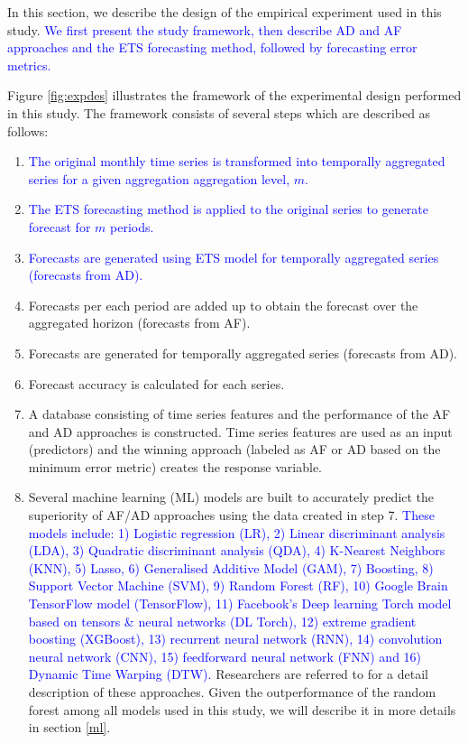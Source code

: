 \documentclass[preprint, 3p,
authoryear]{elsarticle} %
\begin{document}
In this section, we describe the design of the empirical experiment used
in this study.
\textcolor{blue}{We first present the study framework, then describe AD and AF approaches and the ETS forecasting method, followed by forecasting error metrics.}

Figure \ref{fig:expdes} illustrates the framework of the experimental
design performed in this study. The framework consists of several steps
which are described as follows:

\begin{enumerate}
\def\labelenumi{\arabic{enumi}.}
\item
  \textcolor{blue}{The original monthly time series is transformed into temporally aggregated series for a given aggregation aggregation level, $m$.}
\item
  \textcolor{blue}{The ETS forecasting method is applied to the original series to generate forecast for $m$ periods.}
\item
  \textcolor{blue}{Forecasts are generated using ETS model for temporally aggregated series (forecasts from AD).}
\item
  Forecasts per each period are added up to obtain the forecast over the
  aggregated horizon (forecasts from AF).
\item
  Forecasts are generated for temporally aggregated series (forecasts
  from AD).
\item
  Forecast accuracy is calculated for each series.
\item
  A database consisting of time series features and the performance of
  the AF and AD approaches is constructed. Time series features are used
  as an input (predictors) and the winning approach (labeled as AF or AD
  based on the minimum error metric) creates the response variable.
\item
  Several machine learning (ML) models are built to accurately predict
  the superiority of AF/AD approaches using the data created in step 7.
  \textcolor{blue}{These models include: 1) Logistic regression (LR), 2) Linear discriminant analysis (LDA), 3) Quadratic discriminant analysis (QDA), 4) K-Nearest Neighbors (KNN), 5) Lasso, 6) Generalised Additive Model (GAM), 7) Boosting, 8) Support Vector Machine (SVM), 9) Random Forest (RF), 10) Google Brain TensorFlow model (TensorFlow), 11) Facebook's Deep learning Torch model based on tensors \& neural networks (DL Torch), 12) extreme gradient boosting (XGBoost), 13) recurrent neural network (RNN), 14) convolution neural network (CNN), 15) feedforward neural network (FNN) and 16) Dynamic Time Warping (DTW).}
  Researchers are referred to \citet{james2021statistical} for a detail
  description of these approaches. Given the outperformance of the
  random forest among all models used in this study, we will describe it
  in more details in section \ref{ml}.
\end{enumerate}
\end{document}
